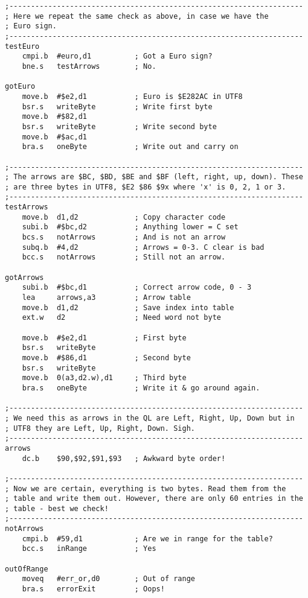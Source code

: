 \begin{lstlisting}[firstnumber=1, caption={Wolfgang's improved ql2utf8 Utility}]
;--------------------------------------------------------------------
; Here we repeat the same check as above, in case we have the
; Euro sign.
;--------------------------------------------------------------------
testEuro
    cmpi.b  #euro,d1          ; Got a Euro sign?
    bne.s   testArrows        ; No.

gotEuro
    move.b  #$e2,d1           ; Euro is $E282AC in UTF8
    bsr.s   writeByte         ; Write first byte
    move.b  #$82,d1
    bsr.s   writeByte         ; Write second byte
    move.b  #$ac,d1
    bra.s   oneByte           ; Write out and carry on

;--------------------------------------------------------------------
; The arrows are $BC, $BD, $BE and $BF (left, right, up, down). These
; are three bytes in UTF8, $E2 $86 $9x where 'x' is 0, 2, 1 or 3.
;--------------------------------------------------------------------
testArrows
    move.b  d1,d2             ; Copy character code
    subi.b  #$bc,d2           ; Anything lower = C set
    bcs.s   notArrows         ; And is not an arrow
    subq.b  #4,d2             ; Arrows = 0-3. C clear is bad
    bcc.s   notArrows         ; Still not an arrow.

gotArrows
    subi.b  #$bc,d1           ; Correct arrow code, 0 - 3
    lea     arrows,a3         ; Arrow table
    move.b  d1,d2             ; Save index into table
    ext.w   d2                ; Need word not byte

    move.b  #$e2,d1           ; First byte
    bsr.s   writeByte
    move.b  #$86,d1           ; Second byte
    bsr.s   writeByte
    move.b  0(a3,d2.w),d1     ; Third byte
    bra.s   oneByte           ; Write it & go around again.

;--------------------------------------------------------------------
; We need this as arrows in the QL are Left, Right, Up, Down but in
; UTF8 they are Left, Up, Right, Down. Sigh.
;--------------------------------------------------------------------
arrows
    dc.b    $90,$92,$91,$93   ; Awkward byte order!

;--------------------------------------------------------------------
; Now we are certain, everything is two bytes. Read them from the
; table and write them out. However, there are only 60 entries in the
; table - best we check!
;--------------------------------------------------------------------
notArrows
    cmpi.b  #59,d1            ; Are we in range for the table?
    bcc.s   inRange           ; Yes

outOfRange
    moveq   #err_or,d0        ; Out of range
    bra.s   errorExit         ; Oops!


\end{lstlisting}
